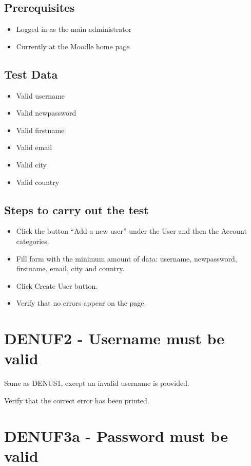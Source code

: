 \documentclass{article}
\begin{document}
\subsection*{Prerequisites}

\begin{itemize}
  \item Logged in as the main administrator
  \item Currently at the Moodle home page
\end{itemize}

\subsection*{Test Data}

\begin{itemize}
  \item Valid username
  \item Valid newpassword
  \item Valid firstname
  \item Valid email
  \item Valid city
  \item Valid country
\end{itemize}

\subsection*{Steps to carry out the test}

\begin{itemize}
  \item Click the button ``Add a new user'' under the User and then
    the Account categories.
  \item Fill form with the minimum amount of data: username, newpassword,
    firstname, email, city and country.
  \item Click Create User button.
  \item Verify that no errors appear on the page.
\end{itemize}

\section*{DENUF2 - Username must be valid}

Same as DENUS1, except an invalid username is provided.


Verify that the correct error has been printed.

\section*{DENUF3a - Password must be valid}
\end{document}
